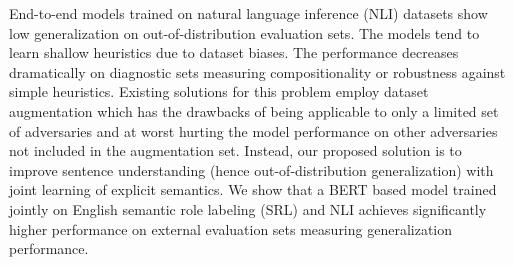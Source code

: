 End-to-end models trained on natural language inference (NLI) datasets show low generalization on out-of-distribution evaluation sets. The models tend to learn shallow heuristics due to dataset biases. The performance decreases dramatically on diagnostic sets measuring compositionality or robustness against simple heuristics. Existing solutions for this problem employ dataset augmentation which has the drawbacks of being applicable to only a limited set of adversaries and at worst hurting the model performance on other adversaries not included in the augmentation set. Instead, our proposed solution is to improve sentence understanding (hence out-of-distribution generalization) with joint learning of explicit semantics. We show that a BERT based model trained jointly on English semantic role labeling (SRL) and NLI achieves significantly higher performance on external evaluation sets measuring generalization performance.
